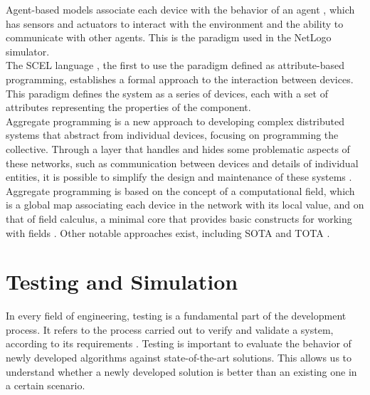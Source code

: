 \documentclass[12pt,a4paper,openright,twoside]{book}
\begin{document}
Agent-based models \cite{MacalN10} associate each device with the behavior of an agent \cite{RussellN95}, which has sensors and actuators to interact with the environment and the ability to communicate with other agents. 
This is the paradigm used in the NetLogo simulator. \\

The SCEL language \cite{NicolaLPT14}, the first to use the paradigm defined as attribute-based programming, establishes a formal approach to the interaction between devices. 
This paradigm defines the system as a series of devices, each with a set of attributes representing the properties of the component. \\

Aggregate programming is a new approach to developing complex distributed systems that abstract from individual devices, focusing on programming the collective.
Through a layer that handles and hides some problematic aspects of these networks, such as communication between devices and details of individual entities,
it is possible to simplify the design and maintenance of these systems \cite{DBLP:journals/computer/BealPV15, DBLP:conf/sfm/BealV16}.
Aggregate programming is based on the concept of a computational field, which is a global map associating each device in the network with its local value,
and on that of field calculus, a minimal core that provides basic constructs for working with fields \cite{DBLP:journals/corr/ViroliADPB16}.
Other notable approaches exist, including SOTA \cite{AbeywickramaBMZ20} and TOTA \cite{MameiVZ04}. 

\section{Testing and Simulation}

In every field of engineering, testing is a fundamental part of the development process. 
It refers to the process carried out to verify and validate a system, according to its requirements \cite{Spillner2011}.
Testing is important to evaluate the behavior of newly developed algorithms against state-of-the-art solutions.
This allows us to understand whether a newly developed solution is better than an existing one in a certain scenario. \\
\end{document}
